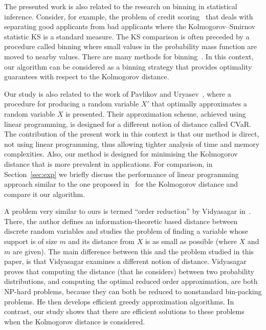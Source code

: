 \documentclass[letterpaper]{article} %
\begin{document}
The presented work is also related to the research on binning in statistical inference. Consider, for example, the problem of credit scoring~\cite{zeng2017comparison} that deals with separating good applicants from bad applicants where the Kolmogorov–Smirnov statistic KS is a standard measure. The KS comparison is often preceded by a procedure called binning where small values in the probability mass function are moved to nearby values. There are many methods for binning~\cite{mays2001handbook,refaat2011credit,bolton2010logistic,siddiqi2012credit}.
In this context, our algorithm can be considered as a binning strategy that provides optimality guarantees with respect to the Kolmogorov distance.

Our study is also related to the work of Pavlikov and Uryasev~, where a procedure for producing a random variable $X'$ that optimally approximates a random variable $X$ is presented. Their approximation scheme, achieved using linear programming, is designed for a different notion of distance called CVaR. The contribution of the present work in this context is that our method is direct, not using linear programming, thus allowing tighter analysis of time and memory complexities. Also, our method is designed for minimising the Kolmogorov distance that is more prevalent in applications. For comparison, in Section~\ref{sec:exp} we briefly discuss the performance of linear programming approach similar to the one proposed in~\cite{pavlikov2016cvar} for the Kolmogorov distance and compare it our algorithm. 

A problem very similar to ours is termed ``order reduction'' by Vidyasagar in~\cite{vidyasagar2012metric}. There, the author defines an information-theoretic based distance between discrete random variables and studies the problem of finding a variable whose support is of size $m$ and its distance from $X$ is as small as possible (where $X$ and $m$ are given). The main difference between this and the problem studied in this paper, is that Vidyasagar examines a different notion of distance. Vidyasagar proves that computing the distance (that he considers) between two probability distributions, and computing the optimal reduced order approximation, are both NP-hard problems, because they can both be reduced to nonstandard bin-packing problems. He then develops efficient greedy approximation algorithms. In contrast, our study shows that there are efficient solutions to these problems when the Kolmogorov distance is considered. 
\end{document}
